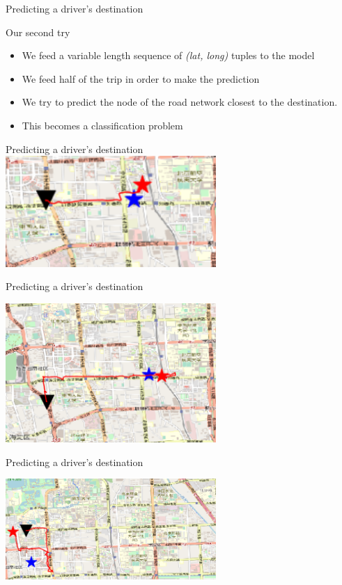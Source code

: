 \documentclass[aspectratio=169]{beamer}
\begin{document}
\begin{frame}{Predicting a driver's destination}

{\Large Our second try}

\begin{itemize}
	\item We feed a variable length sequence of \textit{(lat, long)} tuples to the model
	\item We feed half of the trip in order to make the prediction
	\item We try to predict the node of the road network closest to the destination.
	\item This becomes a classification problem
\end{itemize}
\end{frame}

\begin{frame}{Predicting a driver's destination}
\centering
\includegraphics[width=0.6\textwidth]{figures/ex1_clf}
\end{frame}

\begin{frame}{Predicting a driver's destination}
\centering

\includegraphics[width=0.6\textwidth]{figures/ex2_clf}
\end{frame}

\begin{frame}{Predicting a driver's destination}
\centering

\includegraphics[width=0.6\textwidth]{figures/ex3_clf}
\end{frame}
\end{document}
